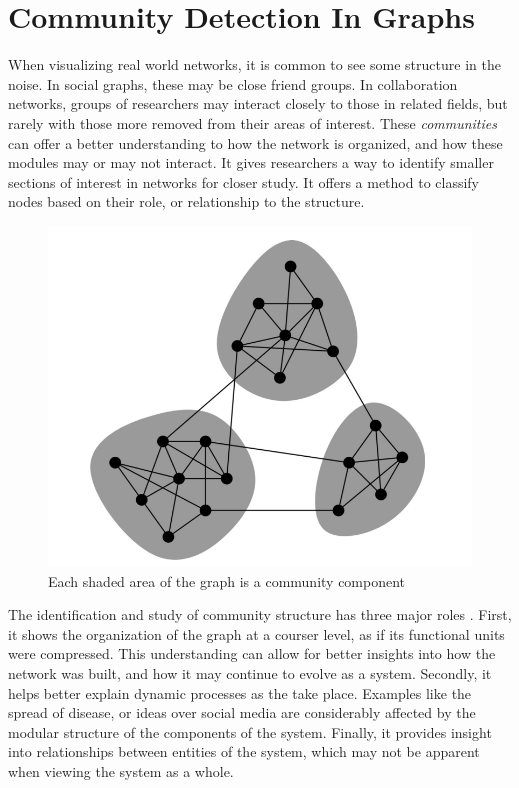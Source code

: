 \section{Community Detection In Graphs}
When visualizing real world networks, it is common to see some structure in the noise. In social graphs, these may be close friend groups. In collaboration networks, groups of researchers may interact closely to those in related fields, but rarely with those more removed from their areas of interest. These \textit{communities} can offer a better understanding to how the network is organized, and how these modules may or may not interact. It gives researchers a way to identify smaller sections of interest in networks for closer study. It offers a method to classify nodes based on their role, or relationship to the structure.
\begin{figure}[!h]
	\begin{center}
		\includegraphics[scale=0.7]{images/communities.png}
	\end{center}
	\caption{Each shaded area of the graph is a community component}
	\label{logo}
\end{figure}


The identification and study of community structure has three major roles \cite{Lancichinetti2010}. First, it shows the organization of the graph at a courser level, as if its functional units were compressed. This understanding can allow for better insights into how the network was built, and how it may continue to evolve as a system. Secondly, it helps better explain dynamic processes as the take place. Examples like the spread of disease, or ideas over social media are considerably affected by the modular structure of the components of the system. Finally, it provides insight into relationships between entities of the system, which may not be apparent when viewing the system as a whole. 

